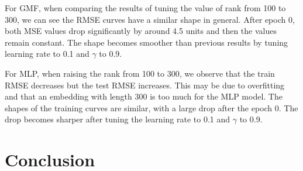 \documentclass[final]{cvpr}
\begin{document}
\hspace{10em}

For GMF, when comparing the results of tuning the value of rank from 100 to 300, we can see the RMSE curves have a similar shape in general. After epoch 0, both MSE values drop significantly by around 4.5 units and then the values remain constant. The shape becomes smoother than previous results by tuning learning rate to 0.1 and $\gamma$ to 0.9. 

For MLP, when raising the rank from 100 to 300, we observe that the train RMSE decreases but the test RMSE increases. This may be due to overfitting and that an embedding with length 300 is too much for the MLP model. The shapes of the training curves are similar, with a large drop after the epoch 0. The drop becomes sharper after tuning the learning rate to 0.1 and $\gamma$ to 0.9.

\section{Conclusion}

{\small
	
	
}
\end{document}
